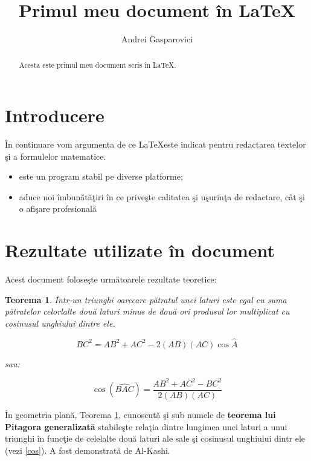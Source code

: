 \documentclass[11pt,a4paper]{article}
\title{\bf Primul meu document în \LaTeX}
\author{Andrei Gasparovici}
\date{}
\newtheorem{teorema}{Teorema}
\begin{document}
	\maketitle

	\begin{abstract}
		Acesta este primul meu document scris în \LaTeX.
	\end{abstract}

	\section{Introducere}

	În continuare vom argumenta de ce \LaTeX este indicat pentru redactarea textelor şi a formulelor matematice.

	\begin{itemize}
	\item este un program stabil pe diverse platforme;
	\item aduce noi îmbunătăţiri în ce priveşte calitatea şi uşurinţa de redactare, cât şi o afişare profesională
	\end{itemize}

	\section{Rezultate utilizate în document}

	Acest document foloseşte următoarele rezultate teoretice:

	\begin{teorema} \label{th-cos}
		Într-un triunghi oarecare pătratul unei laturi este egal cu suma pătratelor celorlalte două laturi minus de două ori produsul lor multiplicat cu cosinusul unghiului dintre ele.

		\begin{equation} \label{cos}
			BC^2 = AB^2	+ AC^2 - 2(AB)(AC)\cos \hat A
		\end{equation}

		sau:

		\begin{equation*}
			\cos(\widehat{BAC}) = \frac{AB^2  + AC^2 - BC^2}{2(AB)(AC)}
		\end{equation*}
	\end{teorema}

	În geometria plană, Teorema \ref{th-cos}, cunoscută şi sub numele de \textbf{teorema lui Pitagora generalizată} stabileşte relaţia dintre lungimea unei laturi a unui triunghi în funcţie de celelalte două laturi ale sale şi cosinusul unghiului dintr ele (vezi \eqref{cos}). A fost demonstrată de Al-Kashi.
\end{document}
